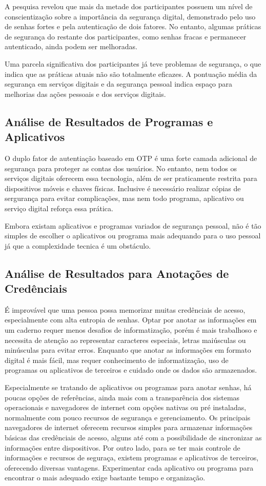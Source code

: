\documentclass[12pt]{article}
\begin{document}
A pesquisa revelou que mais da metade dos participantes possuem um nível de
conscientização sobre a importância da segurança digital, demonstrado pelo uso de
senhas fortes e pela autenticação de dois fatores.
No entanto, algumas práticas de segurança do restante dos participantes, como senhas
fracas e permanecer autenticado, ainda podem ser melhoradas.

Uma parcela significativa dos participantes já teve problemas de segurança, o que
indica que as práticas atuais não são totalmente eficazes.
A pontuação média da segurança em serviços digitais e da segurança pessoal indica
espaço para melhorias das ações pessoais e dos serviços digitais.

\subsection{Análise de Resultados de Programas e Aplicativos}

O duplo fator de autentiação baseado em OTP é uma forte camada adicional de segurança para
proteger as contas dos usuários.
No entanto, nem todos os serviços digitais oferecem essa tecnologia, além de ser praticamente
restrita para dispositivos móveis e chaves físicas.
Inclusive é necessário realizar cópias de sergurança para evitar complicações, mas nem todo
programa, aplicativo ou serviço digital reforça essa prática.

Embora existam aplicativos e programas variados de segurança pessoal, não é tão simples
de escolher o aplicativos ou programa mais adequando para o uso pessoal já que a
complexidade tecnica é um obstáculo.

\subsection{Análise de Resultados para Anotações de Credênciais}

É improvável que uma pessoa possa memorizar muitas credênciais de acesso, especialmente com
alta entropia de senhas.
Optar por anotar as informações em um caderno requer menos desafios de informatização, porém
é mais trabalhoso e necessita de atenção ao representar caracteres especiais, letras
maiúsculas ou minúsculas para evitar erros.
Enquanto que anotar as informações em formato digital é mais fácil, mas requer conhecimento
de informatização, uso de programas ou aplicativos de terceiros e cuidado onde os dados são
armazenados.

Especialmente se tratando de aplicativos ou programas para anotar senhas, há poucas
opções de referências, ainda mais com a transparência dos sistemas operacionais e
navegadores de internet com opções nativas ou pré instaladas, normalmente com pouco
recursos de segurança e gerenciamento.
Os principais navegadores de internet oferecem recursos simples para armazenar informações
básicas das credênciais de acesso, alguns até com a possibilidade de sincronizar as informações
entre dispositivos.
Por outro lado, para se ter mais controle de informações e recursos de seguraça, existem
programas e aplicativos de terceiros, oferecendo diversas vantagens.
Experimentar cada aplicativo ou programa para encontrar o mais adequado exige bastante tempo
e organização.
\end{document}
